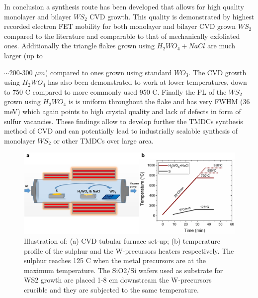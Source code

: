 \documentclass[12pt]{article}
\begin{document}
In conclusion a synthesis route has been developed that allows for high quality monolayer and bilayer $WS_2$ CVD growth. This quality is demonstrated by highest recorded electron FET mobility for both monolayer and bilayer CVD grown $WS_2$ compared to the literature and comparable to that of mechanically exfoliated ones. Additionally the triangle flakes grown using $H_2WO_4 + NaCl$ are much larger (up to {$\sim$200-300 $\mu m$) compared to ones grown using standard $WO_3$. The CVD growth using $H_2WO_4$ has also been demonstrated to work at lower temperatures, down to 750 {\degree}C compared to more commonly used 950 {\degree}C. Finally the PL of the $WS_2$ grown using $H_2WO_4$ is is uniform throughout the flake and has very FWHM (36 meV) which again points to high crystal quality and lack of defects in form of sulfur vacancies. These findings allow to develop further the TMDCs synthesis method of CVD and can potentially lead to industrially scalable synthesis of monolayer $WS_2$ or other TMDCs over large area.



\begin{figure}[h]
\begin{center}
\includegraphics[scale=0.3]{PaperSIFurnace.png}
\caption{Illustration of: (a) CVD tubular furnace set-up; (b) temperature profile of the sulphur and the W-precursors heaters respectively. The sulphur reaches 125 {\degree}C when the metal precursors are at the maximum temperature. The SiO2/Si wafers used as substrate for WS2 growth are placed 1-8 cm downstream the W-precursors crucible and they are subjected to the same temperature.}
\label{fig:PaperSIFurnace}
\end{center}
\end{figure}

}
\end{document}
